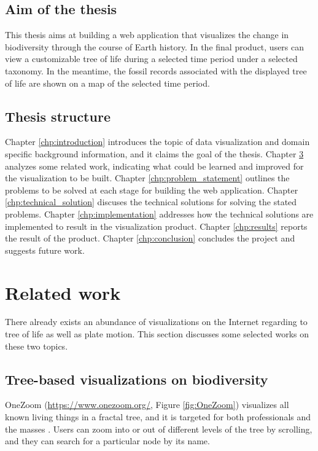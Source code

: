 \documentclass[11pt, a4paper,oneside,chapterprefix=false]{scrbook}
\begin{document}
\section{Aim of the thesis}
This thesis aims at building a web application that visualizes the change in biodiversity through the course of Earth history. In the final product, users can view a customizable tree of life during a selected time period under a selected taxonomy. In the meantime, the fossil records associated with the displayed tree of life are shown on a map of the selected time period. 

\section{Thesis structure}
Chapter \ref{chp:introduction} introduces the topic of data visualization and domain specific background information, and it claims the goal of the thesis. Chapter \ref{chp:related_work} analyzes some related work, indicating what could be learned and improved for the visualization to be built. Chapter \ref{chp:problem_statement} outlines the problems to be solved at each stage for building the web application. Chapter \ref{chp:technical_solution} discuses the technical solutions for solving the stated problems. Chapter \ref{chp:implementation} addresses how the technical solutions are implemented to result in the visualization product. Chapter \ref{chp:results} reports the result of the product. Chapter \ref{chp:conclusion} concludes the project and suggests future work.


\chapter{Related work} \label{chp:related_work}

There already exists an abundance of visualizations on the Internet regarding to tree of life as well as plate motion. This section discusses some selected works on these two topics. 

\section{Tree-based visualizations on biodiversity}
OneZoom (\url{https://www.onezoom.org/}, Figure \ref{fig:OneZoom}) visualizes all known living things in a fractal tree, and it is targeted for both professionals and the masses \cite{rosindell2012onezoom}. Users can zoom into or out of different levels of the tree by scrolling, and they can search for a particular node by its name. 
\end{document}
